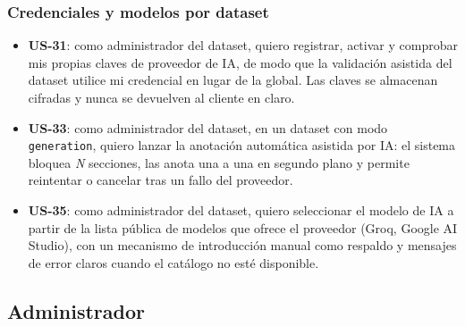 \subsubsection{Credenciales y modelos por dataset}
\begin{itemize}
	\item \textbf{US-31}: como administrador del dataset, quiero registrar, activar y
	      comprobar mis propias claves de proveedor de IA, de modo que la validación
	      asistida del dataset utilice mi credencial en lugar de la global. Las claves se
	      almacenan cifradas y nunca se devuelven al cliente en claro.
	\item \textbf{US-33}: como administrador del dataset, en un dataset con modo
	      \texttt{generation}, quiero lanzar la anotación automática asistida por IA: el
	      sistema bloquea \textit{N} secciones, las anota una a una en segundo plano y
	      permite reintentar o cancelar tras un fallo del proveedor.
	\item \textbf{US-35}: como administrador del dataset, quiero seleccionar el modelo de
	      IA a partir de la lista pública de modelos que ofrece el proveedor (Groq,
	      Google AI Studio), con un mecanismo de introducción manual como respaldo y
	      mensajes de error claros cuando el catálogo no esté disponible.
\end{itemize}

\subsection{Administrador}

